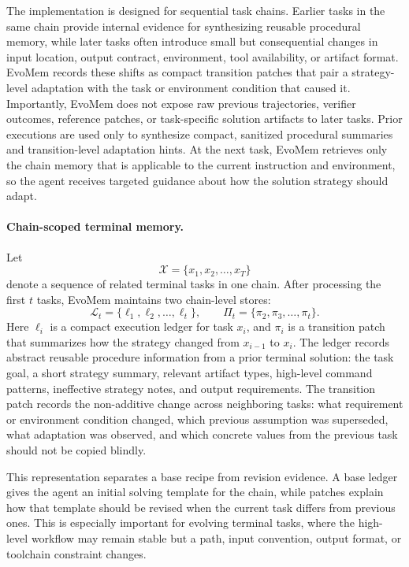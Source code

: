 \documentclass{article}
\begin{document}
The implementation is designed for sequential task chains. Earlier tasks in the same chain provide internal evidence for synthesizing reusable procedural memory, while later tasks often introduce small but consequential changes in input location, output contract, environment, tool availability, or artifact format. EvoMem records these shifts as compact transition patches that pair a strategy-level adaptation with the task or environment condition that caused it. Importantly, EvoMem does not expose raw previous trajectories, verifier outcomes, reference patches, or task-specific solution artifacts to later tasks. Prior executions are used only to synthesize compact, sanitized procedural summaries and transition-level adaptation hints. At the next task, EvoMem retrieves only the chain memory that is applicable to the current instruction and environment, so the agent receives targeted guidance about how the solution strategy should adapt.

\paragraph{Chain-scoped terminal memory.}
Let
\[
\mathcal{X}=\{x_1,x_2,\ldots,x_T\}
\]
denote a sequence of related terminal tasks in one chain. After processing the first $t$ tasks, EvoMem maintains two chain-level stores:
\[
\mathcal{L}_t=\{\ell_1,\ell_2,\ldots,\ell_t\},
\qquad
\Pi_t=\{\pi_2,\pi_3,\ldots,\pi_t\}.
\]
Here $\ell_i$ is a compact execution ledger for task $x_i$, and $\pi_i$ is a transition patch that summarizes how the strategy changed from $x_{i-1}$ to $x_i$. The ledger records abstract reusable procedure information from a prior terminal solution: the task goal, a short strategy summary, relevant artifact types, high-level command patterns, ineffective strategy notes, and output requirements. The transition patch records the non-additive change across neighboring tasks: what requirement or environment condition changed, which previous assumption was superseded, what adaptation was observed, and which concrete values from the previous task should not be copied blindly.

This representation separates a base recipe from revision evidence. A base ledger gives the agent an initial solving template for the chain, while patches explain how that template should be revised when the current task differs from previous ones. This is especially important for evolving terminal tasks, where the high-level workflow may remain stable but a path, input convention, output format, or toolchain constraint changes.
\end{document}
